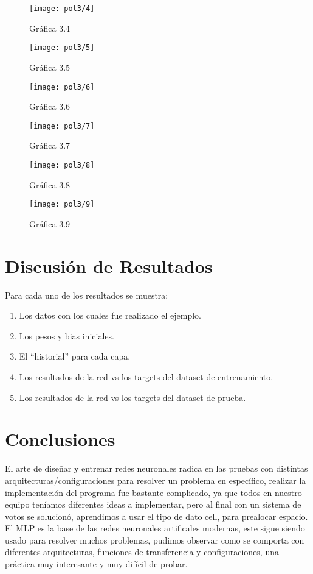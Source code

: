 \documentclass[6pt]{article}
\begin{document}
\begin{figure}[htpb]
	\centering
	\texttt{[image: pol3/4]}
	\caption{Gráfica 3.4}
\end{figure}

\begin{figure}[htpb]
	\centering
	\texttt{[image: pol3/5]}
	\caption{Gráfica 3.5}
\end{figure}

\begin{figure}[htpb]
	\centering
	\texttt{[image: pol3/6]}
	\caption{Gráfica 3.6}
\end{figure}

\begin{figure}[htpb]
	\centering
	\texttt{[image: pol3/7]}
	\caption{Gráfica 3.7}
\end{figure}

\begin{figure}[htpb]
	\centering
	\texttt{[image: pol3/8]}
	\caption{Gráfica 3.8}
\end{figure}

\begin{figure}[htpb]
	\centering
	\texttt{[image: pol3/9]}
	\caption{Gráfica 3.9}
\end{figure}
\newpage
\section{Discusión de Resultados}
Para cada uno de los resultados se muestra:
\begin{enumerate}
	\item Los datos con los cuales fue realizado el ejemplo.
	\item Los pesos y bias iniciales.
	\item El ``historial'' para cada capa.
	\item Los resultados de la red vs los targets del dataset de entrenamiento.
	\item Los resultados de la red vs los targets del dataset de prueba.
\end{enumerate}
\section{Conclusiones}
El arte de diseñar y entrenar redes neuronales radica en las pruebas con distintas arquitecturas/configuraciones para resolver un problema en específico, realizar la implementación del programa fue bastante complicado, ya que todos en nuestro equipo teníamos diferentes ideas a implementar, pero al final con un sistema de votos se solucionó, aprendimos a usar el tipo de dato cell, para prealocar espacio. El MLP es la base de las redes neuronales artificales modernas, este sigue siendo usado para resolver muchos problemas, pudimos observar como se comporta con diferentes arquitecturas, funciones de transferencia y configuraciones, una práctica muy interesante y muy difícil de probar.
\end{document}
